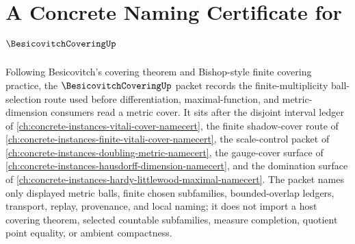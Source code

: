 \chapter{A Concrete Naming Certificate for $\BesicovitchCoveringUp$}
\label{ch:concrete-instances-besicovitch-covering-namecert}

Following Besicovitch's covering theorem and Bishop-style finite covering practice, the $\BesicovitchCoveringUp$ packet records the finite-multiplicity ball-selection route used before differentiation, maximal-function, and metric-dimension consumers read a metric cover. It sits after the disjoint interval ledger of \autoref{ch:concrete-instances-vitali-cover-namecert}, the finite shadow-cover route of \autoref{ch:concrete-instances-finite-vitali-cover-namecert}, the scale-control packet of \autoref{ch:concrete-instances-doubling-metric-namecert}, the gauge-cover surface of \autoref{ch:concrete-instances-hausdorff-dimension-namecert}, and the domination surface of \autoref{ch:concrete-instances-hardy-littlewood-maximal-namecert}. The packet names only displayed metric balls, finite chosen subfamilies, bounded-overlap ledgers, transport, replay, provenance, and local naming; it does not import a host covering theorem, selected countable subfamilies, measure completion, quotient point equality, or ambient compactness.

